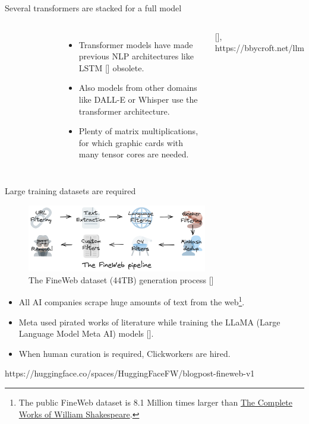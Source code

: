 \documentclass[10pt]{beamer}
\newcommand{\credit}[1]{{\par \raggedleft \scriptsize \mdseries \color{mDarkBrown} #1 \par}}
\newcommand{\creditleft}[1]{{\par \raggedright \scriptsize \mdseries \color{mDarkBrown} #1 \par}}
\newcommand{\citeme}[1]{{\xspace\color{scAqua} \scriptsize [\cite{#1}]}}
\begin{document}
\begin{frame}{Several transformers are stacked for a full model}
\begin{columns}[T,onlytextwidth]
\begin{figure}
		\end{figure}
		\vspace{1cm}
		\begin{itemize}
			\item Transformer models have made previous NLP architectures like LSTM\citeme{Hochreiter1997} obsolete.
			\item Also models from other domains like DALL-E or Whisper use the transformer architecture.
			\item Plenty of matrix multiplications, for which graphic cards with many tensor cores are needed.
		\end{itemize}	
		\vspace{1.5cm} \par
		\creditleft{\citeme{Bycroft2023}, https://bbycroft.net/llm}
	\end{columns}
\end{frame}

\begin{frame}{Large training datasets are required}
	\begin{figure}
		\includegraphics[width=0.7\textwidth]{figures/dist_assets_images_fineweb-recipe.png}
		\caption{The FineWeb dataset (44TB) generation process\citeme{Penedo2024}}
	\end{figure}
	\begin{itemize}
		\item All AI companies scrape huge amounts of text from the web\footnote{\tiny The public FineWeb dataset is 8.1 Million times larger than \href{https://www.gutenberg.org/ebooks/100}{The Complete Works of William Shakespeare}.}.
		\item Meta used pirated works of literature while training the LLaMA (Large Language Model Meta AI) models\citeme{Belanger2025}.
		\item When human curation is required, Clickworkers are hired.
	\end{itemize}
	\credit{https://huggingface.co/spaces/HuggingFaceFW/blogpost-fineweb-v1\par \vspace{0.2cm} \hfill}
\end{frame}
\end{document}
